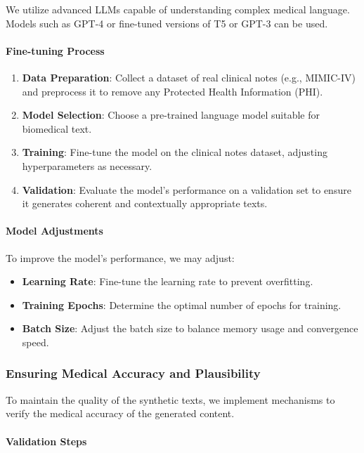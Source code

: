 \documentclass[12pt, a4paper]{article}
\begin{document}
We utilize advanced LLMs capable of understanding complex medical language. Models such as GPT-4 or fine-tuned versions of T5 or GPT-3 can be used.

\paragraph{Fine-tuning Process}

\begin{enumerate}
    \item \textbf{Data Preparation}: Collect a dataset of real clinical notes (e.g., MIMIC-IV) and preprocess it to remove any Protected Health Information (PHI).
    \item \textbf{Model Selection}: Choose a pre-trained language model suitable for biomedical text.
    \item \textbf{Training}: Fine-tune the model on the clinical notes dataset, adjusting hyperparameters as necessary.
    \item \textbf{Validation}: Evaluate the model's performance on a validation set to ensure it generates coherent and contextually appropriate texts.
\end{enumerate}

\paragraph{Model Adjustments}

To improve the model's performance, we may adjust:

\begin{itemize}
    \item \textbf{Learning Rate}: Fine-tune the learning rate to prevent overfitting.
    \item \textbf{Training Epochs}: Determine the optimal number of epochs for training.
    \item \textbf{Batch Size}: Adjust the batch size to balance memory usage and convergence speed.
\end{itemize}

\subsubsection{Ensuring Medical Accuracy and Plausibility}

To maintain the quality of the synthetic texts, we implement mechanisms to verify the medical accuracy of the generated content.

\paragraph{Validation Steps}
\end{document}
